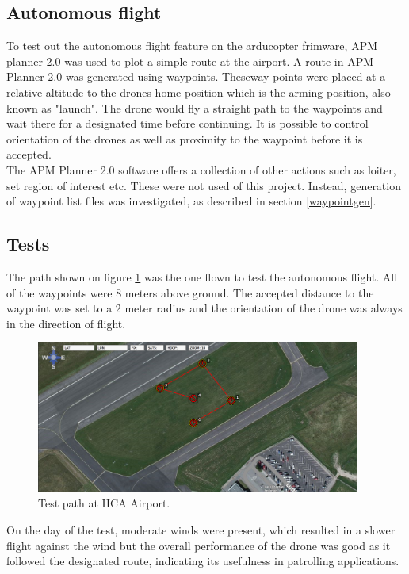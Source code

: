 \subsection{Autonomous flight}
To test out the autonomous flight feature on the arducopter frimware, APM planner 2.0 was used to
plot a simple route at the airport. A route in APM Planner 2.0 was generated using waypoints.
Theseway points were placed at a relative altitude to the drones home position which is the arming
position, also known as "launch".
The drone would fly a straight path to the waypoints and wait there for a designated
time before continuing.
It is possible to control orientation of the drones as well as proximity to the waypoint
before it is accepted.\\
The APM Planner 2.0 software offers a collection of other actions such as loiter, set region of
interest etc. These were not used of this project.
Instead, generation of waypoint list files was investigated, as described in section \ref{waypointgen}.

\subsection{Tests}
The path shown on figure \ref{fig:HCAPath} was the one flown to test the autonomous flight.
All of the waypoints were 8 meters above ground. The accepted distance to the waypoint was set to a 2 meter
radius and the orientation of the drone was always in the direction of flight.

\begin{figure}[H]
  \centering
    \includegraphics[width=0.95\textwidth]{./Images/HCAPath}
  \caption{Test path at HCA Airport.}
  \label{fig:HCAPath}
\end{figure}

On the day of the test, moderate winds were present, which resulted in a slower flight against the wind but the
overall performance of the drone was good as it followed the designated route,
indicating its usefulness in patrolling applications.

